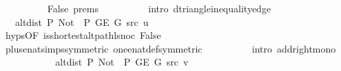 \begin{isabellebody}
\ \ \ \ \ \ \ \ \isamarkupfalse%
\ False\ {\isachardoublequoteopen}{}{\isachardot}{\kern0pt}prems{\isachardoublequoteclose}{\isacharparenleft}{\kern0pt}{}{\isacharparenright}{\kern0pt}\isanewline
\ \ \ \ \ \ \ \ \isamarkupfalse%
\ {\isacharparenleft}{\kern0pt}intro\ d{\isacharunderscore}{\kern0pt}triangle{\isacharunderscore}{\kern0pt}inequality{\isacharunderscore}{\kern0pt}edge{\isacharparenright}{\kern0pt}\isanewline
\ \ \ \ \ \ \isamarkupfalse%
\ \isamarkupfalse%
\ {\isachardoublequoteopen}{\isachardot}{\kern0pt}{\isachardot}{\kern0pt}{\isachardot}{\kern0pt}\ {\isasymle}\ alt{\isacharunderscore}{\kern0pt}dist\ P{\isacharprime}{\kern0pt}{\isacharprime}{\kern0pt}\ {\isacharparenleft}{\kern0pt}Not\ {\isasymcirc}\ P{\isacharprime}{\kern0pt}{\isacharprime}{\kern0pt}{\isacharparenright}{\kern0pt}\ {\isacharparenleft}{\kern0pt}G{\isachardot}{\kern0pt}E\ G{\isacharparenright}{\kern0pt}\ src\ u\ {\isacharplus}{\kern0pt}\ {}{\isachardoublequoteclose}\isanewline
\ \ \ \ \ \ \ \ \isamarkupfalse%
\ {\isachardoublequoteopen}{}{\isachardot}{\kern0pt}hyps{\isachardoublequoteclose}{\isacharbrackleft}{\kern0pt}OF\ is{\isacharunderscore}{\kern0pt}shortest{\isacharunderscore}{\kern0pt}alt{\isacharunderscore}{\kern0pt}path{\isacharunderscore}{\kern0pt}l{\isacharunderscore}{\kern0pt}snoc\ False{\isacharbrackright}{\kern0pt}\isanewline
\ \ \ \ \ \ \ \ \isamarkupfalse%
\ plus{\isacharunderscore}{\kern0pt}enat{\isacharunderscore}{\kern0pt}simps{\isacharparenleft}{\kern0pt}{}{\isacharparenright}{\kern0pt}{\isacharbrackleft}{\kern0pt}symmetric{\isacharbrackright}{\kern0pt}\ one{\isacharunderscore}{\kern0pt}enat{\isacharunderscore}{\kern0pt}def{\isacharbrackleft}{\kern0pt}symmetric{\isacharbrackright}{\kern0pt}\isanewline
\ \ \ \ \ \ \ \ \isamarkupfalse%
\ {\isacharparenleft}{\kern0pt}intro\ add{\isacharunderscore}{\kern0pt}right{\isacharunderscore}{\kern0pt}mono{\isacharparenright}{\kern0pt}\isanewline
\ \ \ \ \ \ \isamarkupfalse%
\ \isamarkupfalse%
\ {\isachardoublequoteopen}{\isachardot}{\kern0pt}{\isachardot}{\kern0pt}{\isachardot}{\kern0pt}\ {\isacharequal}{\kern0pt}\ alt{\isacharunderscore}{\kern0pt}dist\ P{\isacharprime}{\kern0pt}{\isacharprime}{\kern0pt}\ {\isacharparenleft}{\kern0pt}Not\ {\isasymcirc}\ P{\isacharprime}{\kern0pt}{\isacharprime}{\kern0pt}{\isacharparenright}{\kern0pt}\ {\isacharparenleft}{\kern0pt}G{\isachardot}{\kern0pt}E\ G{\isacharparenright}{\kern0pt}\ src\ v{\isachardoublequoteclose}\isanewline

\end{isabellebody}

